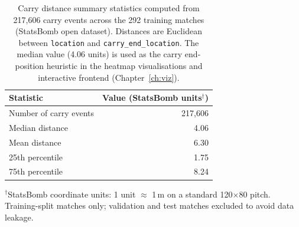 \begin{table}[h]
\centering
\caption{Carry distance summary statistics computed from 217,606 carry events across the 292 training matches (StatsBomb open dataset). Distances are Euclidean between \texttt{location} and \texttt{carry\_end\_location}. The median value (4.06 units) is used as the carry end-position heuristic in the heatmap visualisations and interactive frontend (Chapter~\ref{ch:viz}).}
\begin{tabular}{lr}
\toprule
\textbf{Statistic} & \textbf{Value (StatsBomb units$^{\dagger}$)} \\
\midrule
Number of carry events & 217{,}606 \\
Median distance        & 4.06 \\
Mean distance          & 6.30 \\
25th percentile        & 1.75 \\
75th percentile        & 8.24 \\
\bottomrule
\end{tabular}
\begin{minipage}{\linewidth}
\vspace{4pt}
\footnotesize $^{\dagger}$StatsBomb coordinate units: 1 unit $\approx$ 1\,m on a standard 120$\times$80 pitch. Training-split matches only; validation and test matches excluded to avoid data leakage.
\end{minipage}
\label{tab:carry_stats}
\end{table}
